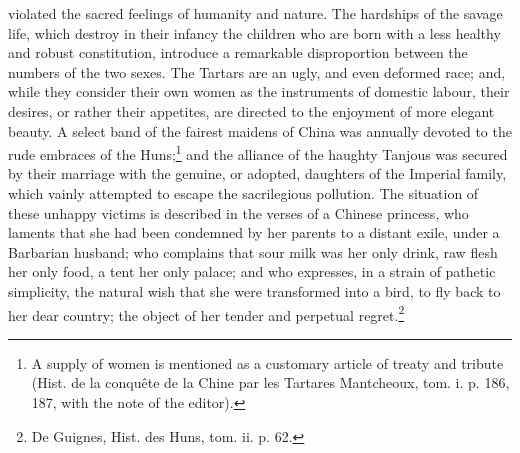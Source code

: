 violated the sacred feelings of humanity and nature. The hardships of the savage life, which destroy in their infancy the children who are born with a less healthy and robust constitution, introduce a remarkable disproportion between the numbers of the two sexes. The Tartars are an ugly, and even deformed race; and, while they consider their own women as the instruments of domestic labour, their desires, or rather their appetites, are directed to the enjoyment of more elegant beauty. A select band of the fairest maidens of China was annually devoted to the rude embraces of the Huns;\footnote{A supply of women is mentioned as a customary article of treaty and tribute (Hist. de la conquête de la Chine par les Tartares Mantcheoux, tom. i. p. 186, 187, with the note of the editor).} and the alliance of the haughty Tanjous was secured by their marriage with the genuine, or adopted, daughters of the Imperial family, which vainly attempted to escape the sacrilegious pollution. The situation of these unhappy victims is described in the verses of a Chinese princess, who laments that she had been condemned by her parents to a distant exile, under a Barbarian husband; who complains that sour milk was her only drink, raw flesh her only food, a tent her only palace; and who expresses, in a strain of pathetic simplicity, the natural wish that she were transformed into a bird, to fly back to her dear country; the object of her tender and perpetual regret.\footnote{De Guignes, Hist. des Huns, tom. ii. p. 62.}

